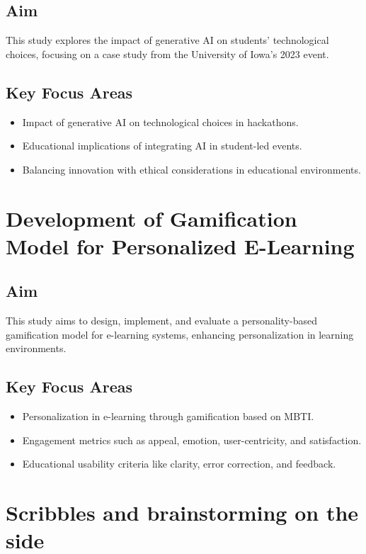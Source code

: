 \documentclass{article}
\begin{document}
\subsection{Aim}
This study explores the impact of generative AI on students' technological choices, focusing on a case study from the University of Iowa's 2023 event.

\subsection{Key Focus Areas}
\begin{itemize}
    \item Impact of generative AI on technological choices in hackathons.
    \item Educational implications of integrating AI in student-led events.
    \item Balancing innovation with ethical considerations in educational environments.
\end{itemize}

\newpage
\section{Development of Gamification Model for Personalized E-Learning}

\subsection{Aim}
This study aims to design, implement, and evaluate a personality-based gamification model for e-learning systems, enhancing personalization in learning environments.

\subsection{Key Focus Areas}
\begin{itemize}
    \item Personalization in e-learning through gamification based on MBTI.
    \item Engagement metrics such as appeal, emotion, user-centricity, and satisfaction.
    \item Educational usability criteria like clarity, error correction, and feedback.
\end{itemize}

\newpage
\section{Scribbles and brainstorming on the side}
\end{document}
